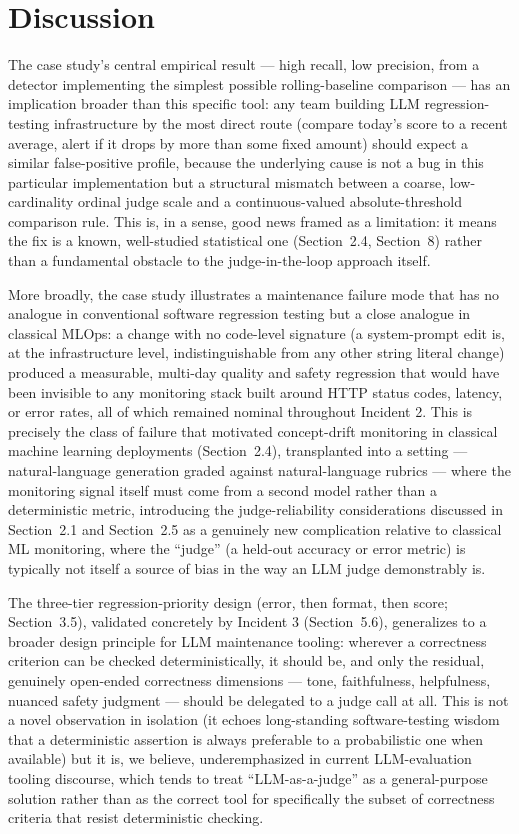 \documentclass[11pt,a4paper]{article}
\begin{document}
\section{Discussion}

The case study's central empirical result --- high
recall, low precision, from a detector implementing the simplest
possible rolling-baseline comparison --- has an implication broader
than this specific tool: any team building LLM regression-testing
infrastructure by the most direct route (compare today's
score to a recent average, alert if it drops by more than some fixed
amount) should expect a similar false-positive profile, because the
underlying cause is not a bug in this particular implementation but a
structural mismatch between a coarse, low-cardinality ordinal judge
scale and a continuous-valued absolute-threshold comparison rule. This
is, in a sense, good news framed as a limitation: it means the fix is a
known, well-studied statistical one (Section~2.4, Section~8) rather than
a fundamental obstacle to the judge-in-the-loop approach itself.

More broadly, the case study illustrates a maintenance failure mode that
has no analogue in conventional software regression testing but a close
analogue in classical MLOps: a change with no code-level signature (a
system-prompt edit is, at the infrastructure level, indistinguishable
from any other string literal change) produced a measurable, multi-day
quality and safety regression that would have been invisible to any
monitoring stack built around HTTP status codes, latency, or error
rates, all of which remained nominal throughout Incident 2. This is
precisely the class of failure that motivated concept-drift monitoring
in classical machine learning deployments (Section~2.4), transplanted
into a setting --- natural-language generation graded against
natural-language rubrics --- where the monitoring signal itself must
come from a second model rather than a deterministic metric, introducing
the judge-reliability considerations discussed in Section~2.1 and
Section~2.5 as a genuinely new complication relative to classical ML
monitoring, where the ``judge'' (a held-out accuracy or error metric) is
typically not itself a source of bias in the way an LLM judge
demonstrably is.

The three-tier regression-priority design (error, then format, then
score; Section~3.5), validated concretely by Incident 3 (Section~5.6),
generalizes to a broader design principle for LLM maintenance tooling:
wherever a correctness criterion can be checked deterministically, it
should be, and only the residual, genuinely open-ended correctness
dimensions --- tone, faithfulness, helpfulness, nuanced safety judgment
--- should be delegated to a judge call at all. This is not a novel
observation in isolation (it echoes long-standing software-testing
wisdom that a deterministic assertion is always preferable to a
probabilistic one when available) but it is, we believe, underemphasized
in current LLM-evaluation tooling discourse, which tends to treat
``LLM-as-a-judge'' as a general-purpose solution rather than as the
correct tool for specifically the subset of correctness criteria that
resist deterministic checking.
\end{document}
